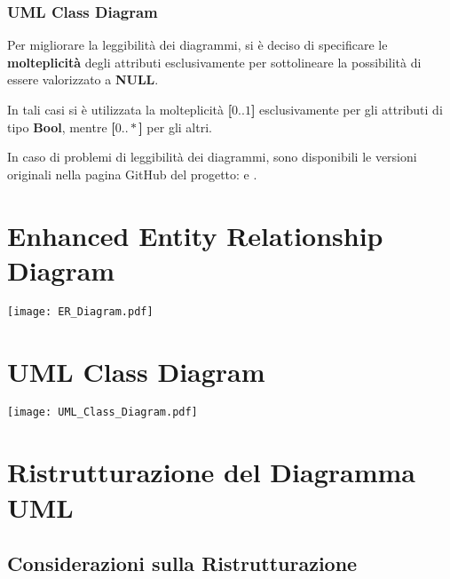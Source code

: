 \subsubsection{UML Class Diagram}

Per migliorare la leggibilità dei diagrammi, si è deciso di specificare le \textbf{molteplicità} degli attributi esclusivamente per sottolineare la possibilità di essere valorizzato a \textbf{NULL}. 

In tali casi si è utilizzata la molteplicità \textbf{[\(0..1\)]} esclusivamente per gli attributi di tipo \textbf{Bool}, mentre \textbf{[\(0..*\)]} per gli altri.

\bigskip

\begin{note}
  In caso di problemi di leggibilità dei diagrammi, sono disponibili le versioni originali nella pagina GitHub del progetto:
   e .
\end{note}

\newpage

\section{Enhanced Entity Relationship Diagram}
\begin{center}
  \texttt{[image: ER\_Diagram.pdf]}
\end{center}

\section{UML Class Diagram}
\begin{center}
  \texttt{[image: UML\_Class\_Diagram.pdf]}
\end{center}

\newpage

\section{Ristrutturazione del Diagramma UML}
\subsection{Considerazioni sulla Ristrutturazione}

